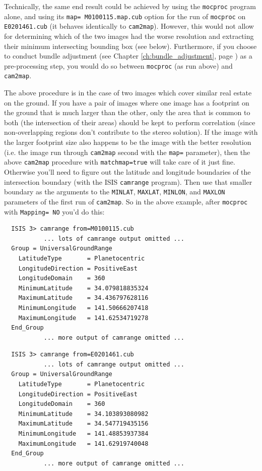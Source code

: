 Technically, the same end result could be achieved by using the
\texttt{mocproc} program alone, and using its \texttt{map=
M0100115.map.cub} option for the run of \texttt{mocproc} on
\texttt{E0201461.cub} (it behaves identically to \texttt{cam2map}).
However, this would not allow for determining which of the two
images had the worse resolution and extracting their minimum
intersecting bounding box (see below).  Furthermore, if you choose
to conduct bundle adjustment (see Chapter \ref{ch:bundle_adjustment},
page \pageref{ch:bundle_adjustment}) as a pre-processing step, you
would do so between \texttt{mocproc} (as run above) and \texttt{cam2map}.

The above procedure is in the case of two images which cover similar
real estate on the ground.  If you have a pair of images where one
image has a footprint on the ground that is much larger than the
other, only the area that is common to both (the intersection of their
areas) should be kept to perform correlation (since non-overlapping
regions don't contribute to the stereo solution).  If the image with
the larger footprint size also happens to be the image with the better
resolution (i.e. the image run through \texttt{cam2map} second with
the \texttt{map=} parameter), then the above \texttt{cam2map}
procedure with \texttt{matchmap=true} will take care of it just fine.
Otherwise you'll need to figure out the latitude and longitude
boundaries of the intersection boundary (with the \ac{ISIS}
\texttt{camrange} program).  Then use that smaller boundary as the
arguments to the \texttt{MINLAT}, \texttt{MAXLAT}, \texttt{MINLON},
and \texttt{MAXLON} parameters of the first run of \texttt{cam2map}.
So in the above example, after \texttt{mocproc} with \texttt{Mapping=
  NO} you'd do this:

\begin{verbatim}
  ISIS 3> camrange from=M0100115.cub
           ... lots of camrange output omitted ...
  Group = UniversalGroundRange
    LatitudeType       = Planetocentric
    LongitudeDirection = PositiveEast
    LongitudeDomain    = 360
    MinimumLatitude    = 34.079818835324
    MaximumLatitude    = 34.436797628116
    MinimumLongitude   = 141.50666207418
    MaximumLongitude   = 141.62534719278
  End_Group
           ... more output of camrange omitted ...
\end{verbatim}

\begin{verbatim}
  ISIS 3> camrange from=E0201461.cub
           ... lots of camrange output omitted ...
  Group = UniversalGroundRange
    LatitudeType       = Planetocentric
    LongitudeDirection = PositiveEast
    LongitudeDomain    = 360
    MinimumLatitude    = 34.103893080982
    MaximumLatitude    = 34.547719435156
    MinimumLongitude   = 141.48853937384
    MaximumLongitude   = 141.62919740048
  End_Group
           ... more output of camrange omitted ...
\end{verbatim}

